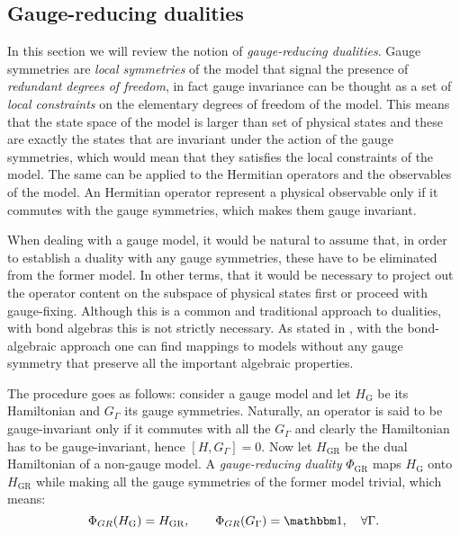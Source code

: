 %
%
\subsection{Gauge-reducing dualities}%
\label{sub:gauge_reducing_dualities}

In this section we will review the notion of \emph{gauge-reducing dualities}.
Gauge symmetries are \emph{local symmetries} of the model that signal the presence of \emph{redundant degrees of freedom}, in fact gauge invariance can be thought as a set of \emph{local constraints} on the elementary degrees of freedom of the model.
This means that the state space of the model is larger than set of physical states and these are exactly the states that are invariant under the action of the gauge symmetries, which would mean that they satisfies the local constraints of the model.
The same can be applied to the Hermitian operators and the observables of the model.
An Hermitian operator represent a physical observable only if it commutes with the gauge symmetries, which makes them gauge invariant.

When dealing with a gauge model, it would be natural to assume that, in order to establish a duality with any gauge symmetries, these have to be eliminated from the former model.
In other terms, that it would be necessary to project out the operator content on the subspace of physical states first or proceed with gauge-fixing.
Although this is a common and traditional approach to dualities, with bond algebras this is not strictly necessary.
As stated in \cite{cobanera2011bond}, with the bond-algebraic approach one can find mappings to models without any gauge symmetry that preserve all the important algebraic properties.

The procedure goes as follows: consider a gauge model and let $H_{\text{G}}$ be its Hamiltonian and $G_{\Gamma}$ its gauge symmetries.
Naturally, an operator is said to be gauge-invariant only if it commutes with all the $G_{\Gamma}$ and
clearly the Hamiltonian has to be gauge-invariant, hence $[H, G_{\Gamma}] = 0$.
Now let $H_{\text{GR}}$ be the dual Hamiltonian of a non-gauge model.
A \emph{gauge-reducing duality} $\Phi_{\text{GR}}$ maps $H_{\text{G}}$ onto $H_{\text{GR}}$ while making all the gauge symmetries of the former model trivial, which means:
\begin{equation}
    \Phi_{GR}(H_{\text{G}}) = H_{\text{GR}}, \qquad
    \Phi_{GR}(G_{\Gamma}) = \identity, \quad \forall \Gamma.
\end{equation}

